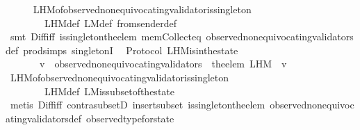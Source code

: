 \begin{isabellebody}
%
\isadelimproof
\ \ \ \ %
\endisadelimproof
%
\isatagproof
{}\isamarkupfalse%
\ L{\isacharunderscore}H{\isacharunderscore}M{\isacharunderscore}of{\isacharunderscore}observed{\isacharunderscore}non{\isacharunderscore}equivocating{\isacharunderscore}validator{\isacharunderscore}is{\isacharunderscore}singleton\ \isanewline
\ \ \ \ \ \ \ \ L{\isacharunderscore}H{\isacharunderscore}M{\isacharunderscore}def\ L{\isacharunderscore}M{\isacharunderscore}def\ from{\isacharunderscore}sender{\isacharunderscore}def\isanewline
\ \ \ \ \isamarkupfalse%
\ {\isacharparenleft}smt\ Diff{\isacharunderscore}iff\ is{\isacharunderscore}singleton{\isacharunderscore}the{\isacharunderscore}elem\ mem{\isacharunderscore}Collect{\isacharunderscore}eq\ observed{\isacharunderscore}non{\isacharunderscore}equivocating{\isacharunderscore}validators{\isacharunderscore}def\ prod{\isachardot}simps{\isacharparenleft}{}{\isacharparenright}\ singletonI{\isacharparenright}%
\endisatagproof
{\isafoldproof}%
%
\isadelimproof
\isanewline
%
\endisadelimproof
\isanewline
{}\isamarkupfalse%
\ {\isacharparenleft}\ Protocol{\isacharparenright}\ L{\isacharunderscore}H{\isacharunderscore}M{\isacharunderscore}is{\isacharunderscore}in{\isacharunderscore}the{\isacharunderscore}state{\isacharcolon}\ \isanewline
\ \ {\isachardoublequoteopen}{\isasymforall}\ {\isasymsigma}\ {\isasymin}\ {\isasymSigma}{\isachardot}\ {\isasymforall}\ v\ {\isasymin}\ observed{\isacharunderscore}non{\isacharunderscore}equivocating{\isacharunderscore}validators\ {\isasymsigma}{\isachardot}\ the{\isacharunderscore}elem\ {\isacharparenleft}L{\isacharunderscore}H{\isacharunderscore}M\ {\isasymsigma}\ v{\isacharparenright}\ {\isasymin}\ {\isasymsigma}{\isachardoublequoteclose}\ \isanewline
%
\isadelimproof
\ \ \ \ %
\endisadelimproof
%
\isatagproof
{}\isamarkupfalse%
\ L{\isacharunderscore}H{\isacharunderscore}M{\isacharunderscore}of{\isacharunderscore}observed{\isacharunderscore}non{\isacharunderscore}equivocating{\isacharunderscore}validator{\isacharunderscore}is{\isacharunderscore}singleton\ \isanewline
\ \ \ \ \ \ \ \ L{\isacharunderscore}H{\isacharunderscore}M{\isacharunderscore}def\ L{\isacharunderscore}M{\isacharunderscore}is{\isacharunderscore}subset{\isacharunderscore}of{\isacharunderscore}the{\isacharunderscore}state\isanewline
\ \ \ \ \isamarkupfalse%
\ {\isacharparenleft}metis\ Diff{\isacharunderscore}iff\ contra{\isacharunderscore}subsetD\ insert{\isacharunderscore}subset\ is{\isacharunderscore}singleton{\isacharunderscore}the{\isacharunderscore}elem\ observed{\isacharunderscore}non{\isacharunderscore}equivocating{\isacharunderscore}validators{\isacharunderscore}def\ observed{\isacharunderscore}type{\isacharunderscore}for{\isacharunderscore}state{\isacharparenright}%

\end{isabellebody}
